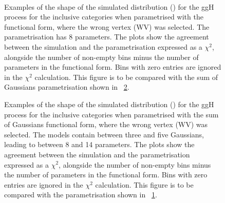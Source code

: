 \begin{figure}[htp!]
\centering
 \\
\caption{Examples of the shape of the simulated \mgg distribution (\GeV) for the ggH process for the inclusive categories when parametrised with the \DCBpG functional form, where the wrong vertex (WV) was selected. The \DCBpG parametrisation has 8 parameters. The plots show the agreement between the simulation and the parametrisation expressed as a $\chi^2$, alongside the number of non-empty bins minus the number of parameters in the functional form. Bins with zero entries are ignored in the $\chi^2$ calculation. This figure is to be compared with the sum of Gaussians parametrisation shown in \Fig~\ref{fig:model:functionalform_quad}.}

\label{fig:model:functionalform_tris}
\end{figure}
\begin{figure}[htp!]
\centering
\caption{Examples of the shape of the simulated \mgg distribution (\GeV) for the ggH process for the inclusive categories when parametrised with the sum of Gaussians functional form, where the wrong vertex (WV) was selected. The models contain between three and five Gaussians, leading to between 8 and 14 parameters. The plots show the agreement between the simulation and the parametrisation expressed as a $\chi^2$, alongside the number of non-empty bins minus the number of parameters in the functional form. Bins with zero entries are ignored in the $\chi^2$ calculation. This figure is to be compared with the \DCBpG parametrisation shown in \Fig~\ref{fig:model:functionalform_tris}.}

\label{fig:model:functionalform_quad}
\end{figure}
